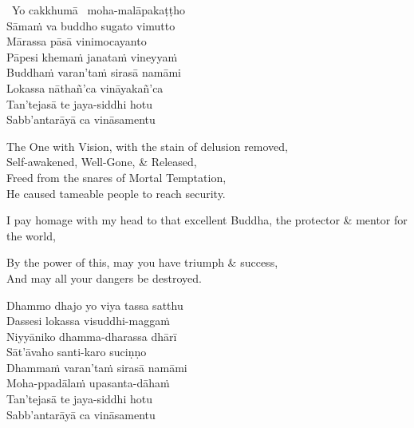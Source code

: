 \begin{pali-hangtogether}
 \anglebracketleft\ \hspace{-0.5mm}Yo cakkhumā \hspace{-0.5mm}\anglebracketright\  moha-malāpakaṭṭho\\
  Sāmaṁ va buddho sugato vimutto\\
  Mārassa pāsā vinimocayanto\\
  Pāpesi khemaṁ janataṁ vineyyaṁ\\
  Buddhaṁ varan'taṁ sirasā namāmi\\
  Lokassa nāthañ'ca vināyakañ'ca\\
  Tan'tejasā te jaya-siddhi hotu\\
  Sabb'antarāyā ca vināsamentu
\end{pali-hangtogether}

\begin{english-verses}
  The One with Vision, with the stain of delusion removed,\\
  Self-awakened, Well-Gone, \& Released,\\
  Freed from the snares of Mortal Temptation,\\
  He caused tameable people to reach security.\\
  \begin{english-hangtogether-verses}
    I pay homage with my head to that excellent Buddha, the protector \& mentor for the world,\\
  \end{english-hangtogether-verses}
  By the power of this, may you have triumph \& success,\\
  And may all your dangers be destroyed.
\end{english-verses}

\begin{pali-hang-continued}
  Dhammo dhajo yo viya tassa satthu\\
  Dassesi lokassa visuddhi-maggaṁ\\
  Niyyāniko dhamma-dharassa dhārī\\
  Sāt'āvaho santi-karo suciṇṇo\\
  Dhammaṁ varan'taṁ sirasā namāmi\\
  Moha-ppadālaṁ upasanta-dāhaṁ\\
  Tan'tejasā te jaya-siddhi hotu\\
  Sabb'antarāyā ca vināsamentu
\end{pali-hang-continued}


